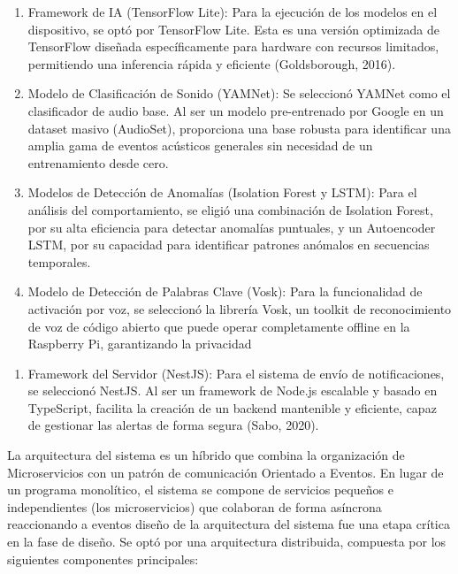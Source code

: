 
\begin{enumerate}
  \item Framework de IA (TensorFlow Lite): Para la ejecución de los modelos en el dispositivo, se optó por TensorFlow Lite. Esta es una versión optimizada de TensorFlow diseñada específicamente para hardware con recursos limitados, permitiendo una inferencia rápida y eficiente (Goldsborough, 2016).
  \item Modelo de Clasificación de Sonido (YAMNet): Se seleccionó YAMNet como el clasificador de audio base. Al ser un modelo pre-entrenado por Google en un dataset masivo (AudioSet), proporciona una base robusta para identificar una amplia gama de eventos acústicos generales sin necesidad de un entrenamiento desde cero.
  \item Modelos de Detección de Anomalías (Isolation Forest y LSTM): Para el análisis del comportamiento, se eligió una combinación de Isolation Forest, por su alta eficiencia para detectar anomalías puntuales, y un Autoencoder LSTM, por su capacidad para identificar patrones anómalos en secuencias temporales.
  \item Modelo de Detección de Palabras Clave (Vosk): Para la funcionalidad de activación por voz, se seleccionó la librería Vosk, un toolkit de reconocimiento de voz de código abierto que puede operar completamente offline en la Raspberry Pi, garantizando la privacidad
\end{enumerate}

\begin{enumerate}
  \item Framework del Servidor (NestJS): Para el sistema de envío de notificaciones, se seleccionó NestJS. Al ser un framework de Node.js escalable y basado en TypeScript, facilita la creación de un backend mantenible y eficiente, capaz de gestionar las alertas de forma segura (Sabo, 2020).
\end{enumerate}



La arquitectura del sistema es un híbrido que combina la organización de Microservicios con un patrón de comunicación Orientado a Eventos. En lugar de un programa monolítico, el sistema se compone de servicios pequeños e independientes (los microservicios) que colaboran de forma asíncrona reaccionando a eventos diseño de la arquitectura del sistema fue una etapa crítica en la fase de diseño. Se optó por una arquitectura distribuida, compuesta por los siguientes componentes principales:

